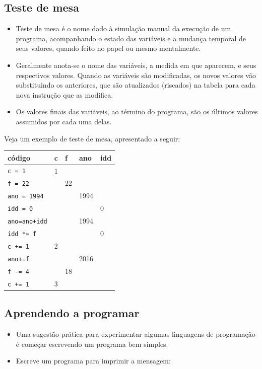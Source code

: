 \documentclass[12pt,a4paper]{article}
\begin{document}
    \hypertarget{teste-de-mesa}{%
\subsection{Teste de mesa}\label{teste-de-mesa}}

    \begin{itemize}
\item
  Teste de mesa é o nome dado à simulação manual da execução de um
  programa, acompanhando o estado das variáveis e a mudança temporal de
  seus valores, quando feito no papel ou mesmo mentalmente.
\item
  Geralmente anota-se o nome das variáveis, a medida em que aparecem, e
  seus respectivos valores. Quando as variáveis são modificadas, os
  novos valores vão substituindo os anteriores, que são atualizados
  (riscados) na tabela para cada nova instrução que as modifica.
\item
  Os valores finais das variáveis, ao término do programa, são os
  últimos valores assumidos por cada uma delas.
\end{itemize}

Veja um exemplo de teste de mesa, apresentado a seguir:

\begin{longtable}[]{@{}lllll@{}}
\toprule
código & c & f & ano & idd\tabularnewline
\midrule
\endhead
\texttt{c\ =\ 1} & 1 & & &\tabularnewline
\texttt{f\ =\ 22} & & 22 & &\tabularnewline
\texttt{ano\ =\ 1994} & & & 1994 &\tabularnewline
\texttt{idd\ =\ 0} & & & & 0\tabularnewline
\texttt{ano=ano+idd} & & & 1994 &\tabularnewline
\texttt{idd\ *=\ f} & & & & 0\tabularnewline
\texttt{c\ +=\ 1} & 2 & & &\tabularnewline
\texttt{ano+=f} & & & 2016 &\tabularnewline
\texttt{f\ -=\ 4} & & 18 & &\tabularnewline
\texttt{c\ +=\ 1} & 3 & & &\tabularnewline
\bottomrule
\end{longtable}

    \hypertarget{aprendendo-a-programar}{%
\subsection{Aprendendo a programar}\label{aprendendo-a-programar}}

    \begin{itemize}
\item
  Uma sugestão prática para experimentar algumas linguagens de
  programação é começar escrevendo um programa bem simples.
\item
  Escreve um programa para imprimir a mensagem:
\end{itemize}
\end{document}

